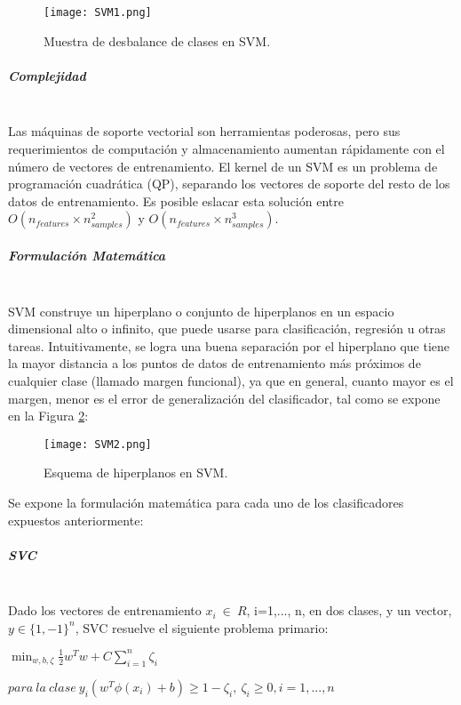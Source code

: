 \begin{figure}[!h]
	
	\centering
	\texttt{[image: SVM1.png]}
	\caption{Muestra de desbalance de clases en SVM.}
	\label{SVM1}
\end{figure}

\subparagraph{Complejidad\\\\}

Las máquinas de soporte vectorial son herramientas poderosas, pero sus requerimientos de
computación y almacenamiento aumentan rápidamente con el número de vectores de entrenamiento. El kernel de un SVM es un problema de programación cuadrática (QP), separando los vectores de soporte del resto de los datos de entrenamiento. Es posible eslacar esta solución entre $ O(n_{features} \times n_{samples}^2)$ y $O(n_{features} \times n_{samples}^3)$.

\subparagraph{Formulación Matemática\\\\}

SVM construye un hiperplano o conjunto de hiperplanos en un espacio dimensional alto o infinito, que puede usarse para clasificación, regresión u otras tareas.
Intuitivamente, se logra una buena separación por el hiperplano que tiene la mayor distancia a los
puntos de datos de entrenamiento más próximos de cualquier clase (llamado margen funcional), ya
que en general, cuanto mayor es el margen, menor es el error de generalización del clasificador, tal como se expone en la Figura  \ref{SVM2}:

\begin{figure}[!h]
	\centering
	\texttt{[image: SVM2.png]}
	\caption{Esquema de hiperplanos en SVM.}
	\label{SVM2}
	
\end{figure}

Se expone la formulación matemática para cada uno de los clasificadores expuestos anteriormente:

\subparagraph{SVC\\\\}

Dado los vectores de entrenamiento $x_{i}\ \in\ R$,
 i=1,..., n, en dos clases, y un vector, $y \in \{1, -1\}^n$, SVC resuelve el siguiente problema primario:

\begin{center}
	$\min_ {w, b, \zeta} \frac{1}{2} w^T w + C \sum_{i=1}^{n} \zeta_i$
\end{center}
\begin{center}
	
	$para\ la\ clase\ y_i (w^T \phi (x_i) + b) \geq 1 - \zeta_i,\ \zeta_i \geq 0, i=1, ..., n$	
\end{center}

